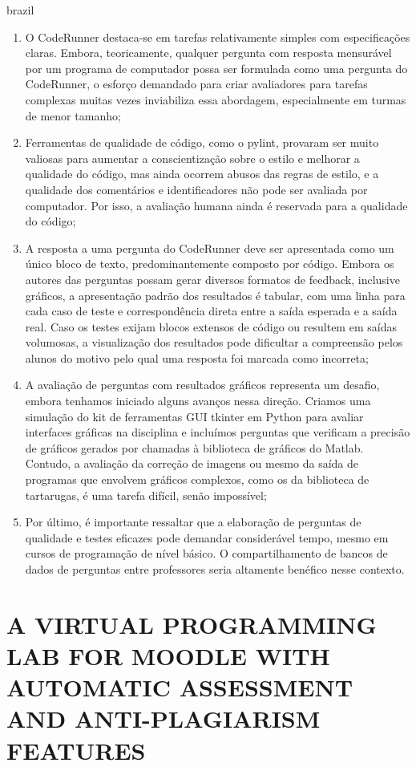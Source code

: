 \begin{otherlanguage*}{brazil}
\begin{enumerate} [label=(\alph*)]
    \item O CodeRunner destaca-se em tarefas relativamente simples com especificações claras. Embora, teoricamente, qualquer pergunta com resposta mensurável por um programa de computador possa ser formulada como uma pergunta do CodeRunner, o esforço demandado para criar avaliadores para tarefas complexas muitas vezes inviabiliza essa abordagem, especialmente em turmas de menor tamanho;
    \item Ferramentas de qualidade de código, como o pylint, provaram ser muito valiosas para aumentar a conscientização sobre o estilo e melhorar a qualidade do código, mas ainda ocorrem abusos das regras de estilo, e a qualidade dos comentários e identificadores não pode ser avaliada por computador. Por isso, a avaliação humana ainda é reservada para a qualidade do código;
    \item A resposta a uma pergunta do CodeRunner deve ser apresentada como um único bloco de texto, predominantemente composto por código. Embora os autores das perguntas possam gerar diversos formatos de feedback, inclusive gráficos, a apresentação padrão dos resultados é tabular, com uma linha para cada caso de teste e correspondência direta entre a saída esperada e a saída real. Caso os testes exijam blocos extensos de código ou resultem em saídas volumosas, a visualização dos resultados pode dificultar a compreensão pelos alunos do motivo pelo qual uma resposta foi marcada como incorreta;
    \item A avaliação de perguntas com resultados gráficos representa um desafio, embora tenhamos iniciado alguns avanços nessa direção. Criamos uma simulação do kit de ferramentas GUI tkinter em Python para avaliar interfaces gráficas na disciplina e incluímos perguntas que verificam a precisão de gráficos gerados por chamadas à biblioteca de gráficos do Matlab. Contudo, a avaliação da correção de imagens ou mesmo da saída de programas que envolvem gráficos complexos, como os da biblioteca de tartarugas, é uma tarefa difícil, senão impossível;
    \item Por último, é importante ressaltar que a elaboração de perguntas de qualidade e testes eficazes pode demandar considerável tempo, mesmo em cursos de programação de nível básico. O compartilhamento de bancos de dados de perguntas entre professores seria altamente benéfico nesse contexto.
\end{enumerate}


\section{A VIRTUAL PROGRAMMING LAB FOR MOODLE WITH AUTOMATIC ASSESSMENT AND ANTI-PLAGIARISM FEATURES}


\end{otherlanguage*}
